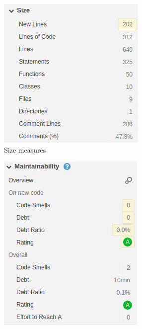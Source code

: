 \documentclass[margin,line,a4paper,authoryear,12pt]{report}
\begin{document}
\begin{figure}[h!]
    \begin{subfigure}{0.4\linewidth}
    \centering
    \includegraphics[width=\linewidth]{Size_measures.png}
    \caption{Size measures}
    \label{fig:SonarCloud}
    \end{subfigure}
    \begin{subfigure}{0.4\linewidth}
        \centering
        \includegraphics[width=\linewidth]{maintainability_measures.png}

\end{subfigure}
\end{figure}
\end{document}
